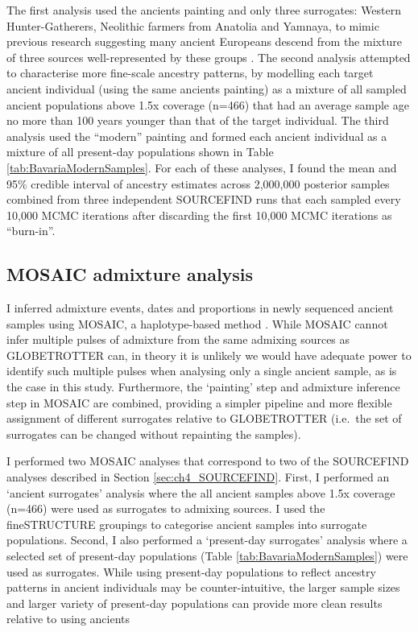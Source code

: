 The first analysis used the ancients painting and only three surrogates: Western Hunter-Gatherers, Neolithic farmers from Anatolia and Yamnaya, to mimic previous research suggesting many ancient Europeans descend from the mixture of three sources well-represented by these groups \cite{Lazaridis2014}. The second analysis attempted to characterise more fine-scale ancestry patterns, by modelling each target ancient individual (using the same ancients painting) as a mixture of all sampled ancient populations above 1.5x coverage (n=466) that had an average sample age no more than 100 years younger than that of the target individual. The third analysis used the ``modern'' painting and formed each ancient individual as a mixture of all present-day populations shown in Table \ref{tab:BavariaModernSamples}. For each of these analyses, I found the mean and 95\% credible interval of ancestry estimates across 2,000,000 posterior samples combined from three independent SOURCEFIND runs that each sampled every 10,000 MCMC iterations after discarding the first 10,000 MCMC iterations as ``burn-in''.


\subsection{MOSAIC admixture analysis}

I inferred admixture events, dates and proportions in newly sequenced ancient samples using MOSAIC, a haplotype-based method \cite{MOSAIC_2019}. While MOSAIC cannot infer multiple pulses of admixture from the same admixing sources as GLOBETROTTER \cite{Hellenthal2014} can, in theory it is unlikely we would have adequate power to identify such multiple pulses when analysing only a single ancient sample, as is the case in this study. Furthermore, the `painting' step and admixture inference step in MOSAIC are combined, providing a simpler pipeline and more flexible assignment of different surrogates relative to GLOBETROTTER (i.e.\ the set of surrogates can be changed without repainting the samples).

I performed two MOSAIC analyses that correspond to two of the SOURCEFIND analyses described in Section \ref{sec:ch4_SOURCEFIND}. First, I performed an `ancient surrogates' analysis where the all ancient samples above 1.5x coverage (n=466) were used as surrogates to admixing sources. I used the fineSTRUCTURE groupings to categorise ancient samples into surrogate populations. Second, I also performed a `present-day surrogates' analysis where a selected set of present-day populations (Table \ref{tab:BavariaModernSamples}) were used as surrogates. While using present-day populations to reflect ancestry patterns in ancient individuals may be counter-intuitive, the larger sample sizes and larger variety of present-day populations can provide more clean results relative to using ancients

